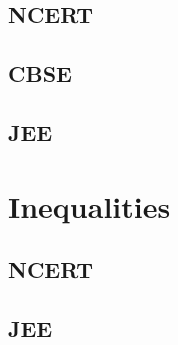 \documentclass[journal]{IEEEtran}
\begin{document}
\subsection{NCERT}
 
\subsection{CBSE}
 
\subsection{JEE}
 
\section{Inequalities}
\subsection{NCERT}

\subsection{JEE}

\fi
\end{document}
